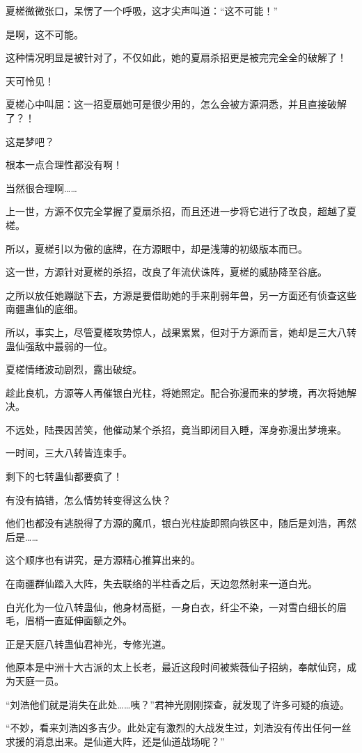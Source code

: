 \begin{this_body}
夏槎微微张口，呆愣了一个呼吸，这才尖声叫道：“这不可能！”

是啊，这不可能。

这种情况明显是被针对了，不仅如此，她的夏扇杀招更是被完完全全的破解了！

天可怜见！

夏槎心中叫屈：这一招夏扇她可是很少用的，怎么会被方源洞悉，并且直接破解了？！

这是梦吧？

根本一点合理性都没有啊！

当然很合理啊……

上一世，方源不仅完全掌握了夏扇杀招，而且还进一步将它进行了改良，超越了夏槎。

所以，夏槎引以为傲的底牌，在方源眼中，却是浅薄的初级版本而已。

这一世，方源针对夏槎的杀招，改良了年流伏诛阵，夏槎的威胁降至谷底。

之所以放任她蹦跶下去，方源是要借助她的手来削弱年兽，另一方面还有侦查这些南疆蛊仙的底细。

所以，事实上，尽管夏槎攻势惊人，战果累累，但对于方源而言，她却是三大八转蛊仙强敌中最弱的一位。

夏槎情绪波动剧烈，露出破绽。

趁此良机，方源等人再催银白光柱，将她照定。配合弥漫而来的梦境，再次将她解决。

不远处，陆畏因苦笑，他催动某个杀招，竟当即闭目入睡，浑身弥漫出梦境来。

一时间，三大八转皆连束手。

剩下的七转蛊仙都要疯了！

有没有搞错，怎么情势转变得这么快？

他们也都没有逃脱得了方源的魔爪，银白光柱旋即照向铁区中，随后是刘浩，再然后是……

这个顺序也有讲究，是方源精心推算出来的。

在南疆群仙踏入大阵，失去联络的半柱香之后，天边忽然射来一道白光。

白光化为一位八转蛊仙，他身材高挺，一身白衣，纤尘不染，一对雪白细长的眉毛，眉梢一直延伸面额之外。

正是天庭八转蛊仙君神光，专修光道。

他原本是中洲十大古派的太上长老，最近这段时间被紫薇仙子招纳，奉献仙窍，成为天庭一员。

“刘浩他们就是消失在此处……咦？”君神光刚刚探查，就发现了许多可疑的痕迹。

“不妙，看来刘浩凶多吉少。此处定有激烈的大战发生过，刘浩没有传出任何一丝求援的消息出来。是仙道大阵，还是仙道战场呢？”


\end{this_body}
